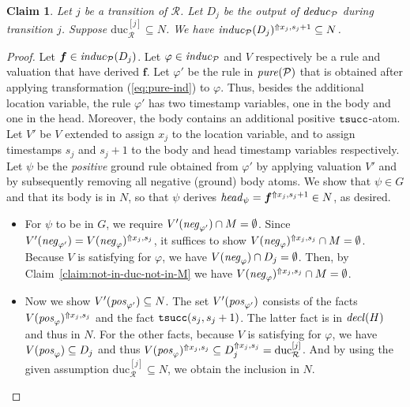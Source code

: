 \documentclass{tlp}
\newtheorem{claim}[theorem]{Claim}
\newcommand{\ded}{\mathcal{P}}
\newcommand{\fc}{\boldsymbol{f}}
\newcommand{\rl}{\varphi}
\newcommand{\head}[1]{\fname{head}_{#1}}
\newcommand{\bpos}[1]{\fname{pos}_{#1}}
\newcommand{\bneg}[1]{\fname{neg}_{#1}}
\newcommand{\grl}{\psi}
\newcommand{\addlt}[3]{#1^{\Uparrow#2,#3}}
\newcommand{\timesucc}{\pred{tsucc}}
\newcommand{\decl}[1]{\fname{decl}(#1)}
\newcommand{\pure}[1]{\fname{pure}(#1)}
\newcommand{\run}{\mathcal{R}}
\newcommand{\deduc}[1]{\fname{deduc}_{#1}}
\newcommand{\induc}[1]{\fname{induc}_{#1}}
\newcommand{\mstep}[1]{(#1)}
\newcommand{\sliceduc}[1]{\text{duc}_{\run}^{[#1]}}
\newcommand{\grded}{G}
\begin{document}
\begin{appendix}
\tline



\begin{claim}\label{claim:ind-in-stable}Let $j$ be a transition
of $\run$. Let $D_{j}$ be the output of $\deduc{\ded}$ during transition
$j$. Suppose $\sliceduc j\subseteq N$. We have $\addlt{\induc{\ded}\mstep{D_{j}}}{x_{j}}{s_{j}+1}\subseteq N$.\end{claim}

\begin{proof}

Let $\fc\in\induc{\ded}\mstep{D_{j}}$. Let $\rl\in\induc{\ded}$
and $V$ respectively be a rule and valuation that have derived $\fc$.
Let $\rl'$ be the rule in $\pure{\ded}$ that is obtained after applying
transformation (\ref{eq:pure-ind}) to $\rl$. Thus, besides the additional
location variable, the rule $\rl'$ has two timestamp variables, one
in the body and one in the head. Moreover, the body contains an additional
positive $\timesucc$-atom. Let $V'$ be $V$ extended to assign $x_{j}$
to the location variable, and to assign timestamps $s_{j}$ and $s_{j}+1$
to the body and head timestamp variables respectively. Let $\grl$
be the \emph{positive} ground rule obtained from $\rl'$ by applying
valuation $V'$ and by subsequently removing all negative (ground)
body atoms. We show that $\grl\in\grded$ and that its body is in
$N$, so that $\grl$ derives $\head{\grl}=\addlt{\fc}{x_{j}}{s_{j}+1}\in N$,
as desired.
\begin{itemize}
\item For $\grl$ to be in $\grded$, we require $V'(\bneg{\rl'})\cap M=\emptyset$.
Since $V'(\bneg{\rl'})=\addlt{V(\bneg{\rl})}{x_{j}}{s_{j}}$, it suffices
to show $\addlt{V(\bneg{\rl})}{x_{j}}{s_{j}}\cap M=\emptyset$. Because
$V$ is satisfying for $\rl$, we have $V(\bneg{\rl})\cap D_{j}=\emptyset$.
Then, by Claim~\ref{claim:not-in-duc-not-in-M} we have $\addlt{V(\bneg{\rl})}{x_{j}}{s_{j}}\cap M=\emptyset$.
\item Now we show $V'(\bpos{\rl'})\subseteq N$. The set $V'(\bpos{\rl'})$
consists of the facts $\addlt{V(\bpos{\rl})}{x_{j}}{s_{j}}$ and the
fact $\timesucc(s_{j},s_{j}+1)$. The latter fact is in $\decl H$
and thus in $N$. For the other facts, because $V$ is satisfying
for $\rl$, we have $V(\bpos{\rl})\subseteq D_{j}$ and thus $\addlt{V(\bpos{\rl})}{x_{j}}{s_{j}}\subseteq\addlt{D_{j}}{x_{j}}{s_{j}}=\sliceduc j$.
And by using the given assumption $\sliceduc j\subseteq N$, we obtain
the inclusion in $N$.
\end{itemize}
\end{proof}




\end{appendix}
\end{document}
